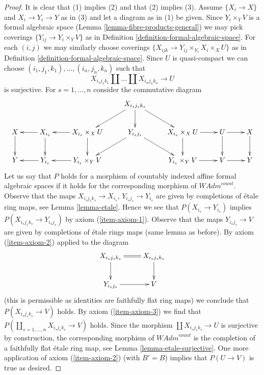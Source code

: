 \documentclass{stacks-project}
\theoremstyle{plain}
\theoremstyle{definition}
\theoremstyle{remark}
\numberwithin{equation}{subsection}
\begin{document}
\begin{proof}
It is clear that (1) implies (2) and that (2) implies (3).
Assume $\{X_i \to X\}$ and $X_i \to Y_i \to Y$ as in (3)
and let a diagram as in (1) be given.
Since $Y_i \times_Y V$ is a formal algebraic space
(Lemma \ref{lemma-fibre-products-general}) we may pick
coverings $\{Y_{ij} \to Y_i \times_Y V\}$ as in
Definition \ref{definition-formal-algebraic-space}.
For each $(i, j)$ we may similarly choose coverings
$\{X_{ijk} \to Y_{ij} \times_{Y_i} X_i \times_X U\}$
as in Definition \ref{definition-formal-algebraic-space}.
Since $U$ is quasi-compact we can choose
$(i_1, j_1, k_1), \ldots, (i_n, j_n, k_n)$ such that
$$
X_{i_1 j_1 k_1} \amalg \ldots \amalg X_{i_n j_n k_n} \longrightarrow U
$$
is surjective. For $s = 1, \ldots, n$ consider the commutative diagram
$$
\xymatrix{
& & & X_{i_s j_s k_s} \ar[ld] \ar[d] \ar[rd] \\
X \ar[d] & X_{i_s} \ar[l] \ar[d] &
X_{i_s} \times_X U \ar[l] \ar[d] & Y_{i_s j_s} \ar[ld] \ar[rd] &
X_{i_s} \times_X U \ar[d] \ar[r] &
U \ar[d] \ar[r] & X \ar[d] \\
Y & Y_{i_s} \ar[l] &
Y_{i_s} \times_Y V \ar[l] & &
Y_{i_s} \times_Y V \ar[r] &
V \ar[r] & Y
}
$$
Let us say that $P$ holds for a morphism of countably indexed
affine formal algebraic spaces if it holds for the corresponding
morphism of $\textit{WAdm}^{count}$. Observe that the maps
$X_{i_s j_s k_s} \to X_{i_s}$, $Y_{i_s j_s} \to Y_{i_s}$
are given by completions of \'etale ring maps, see Lemma \ref{lemma-etale}.
Hence we see that $P(X_{i_s} \to Y_{i_s})$ implies
$P(X_{i_s j_s k_s} \to Y_{i_s j_s})$ by axiom (\ref{item-axiom-1}).
Observe that the maps $Y_{i_s j_s} \to V$ are given by completions of
\'etale rings maps (same lemma as before).
By axiom (\ref{item-axiom-2}) applied to the diagram
$$
\xymatrix{
X_{i_s j_s k_s} \ar@{=}[r] \ar[d] & X_{i_s j_s k_s} \ar[d] \\
Y_{i_s j_s} \ar[r] & V
}
$$
(this is permissible as identities are faithfully flat ring maps)
we conclude that $P(X_{i_s j_s k_s} \to V)$ holds.
By axiom (\ref{item-axiom-3}) we find that
$P(\coprod_{s = 1, \ldots, n} X_{i_s j_s k_s} \to V)$ holds.
Since the morphism $\coprod X_{i_s j_s k_s} \to U$ is surjective
by construction, the corresponding morphism of $\textit{WAdm}^{count}$
is the completion of a faithfully flat \'etale ring map, see
Lemma \ref{lemma-etale-surjective}.
One more application of axiom (\ref{item-axiom-2})
(with $B' = B$) implies that $P(U \to V)$ is true as desired.
\end{proof}
\end{document}
